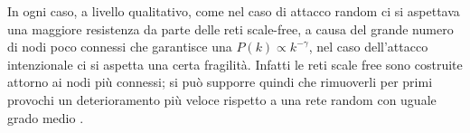 In ogni caso, a livello qualitativo, come nel caso di attacco random ci si aspettava una maggiore resistenza da parte delle reti scale-free, a causa del grande numero di nodi poco connessi che garantisce una $P(k)\propto k^{-\gamma}$, nel caso dell'attacco intenzionale ci si aspetta una certa fragilità. Infatti le reti scale free sono costruite attorno ai nodi più connessi; si può supporre quindi che rimuoverli per primi provochi un deterioramento più veloce rispetto a una rete random con uguale grado medio \parencite{Barbalbert2002}.

